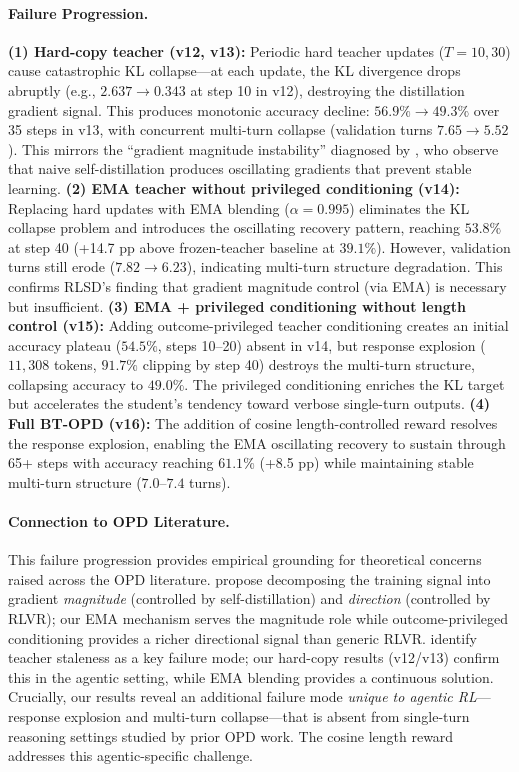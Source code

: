 \documentclass{article}
\begin{document}
\paragraph{Failure Progression.}
\textbf{(1) Hard-copy teacher (v12, v13):} Periodic hard teacher updates ($T{=}10, 30$) cause catastrophic KL collapse---at each update, the KL divergence drops abruptly (e.g., $2.637 \to 0.343$ at step 10 in v12), destroying the distillation gradient signal. This produces monotonic accuracy decline: $56.9\% \to 49.3\%$ over 35 steps in v13, with concurrent multi-turn collapse (validation turns $7.65 \to 5.52$). This mirrors the ``gradient magnitude instability'' diagnosed by \citet{yang26rlsd}, who observe that naive self-distillation produces oscillating gradients that prevent stable learning.
%
\textbf{(2) EMA teacher without privileged conditioning (v14):} Replacing hard updates with EMA blending ($\alpha{=}0.995$) eliminates the KL collapse problem and introduces the oscillating recovery pattern, reaching $53.8\%$ at step 40 (+14.7 pp above frozen-teacher baseline at $39.1\%$). However, validation turns still erode ($7.82 \to 6.23$), indicating multi-turn structure degradation. This confirms RLSD's finding that gradient magnitude control (via EMA) is necessary but insufficient.
%
\textbf{(3) EMA + privileged conditioning without length control (v15):} Adding outcome-privileged teacher conditioning creates an initial accuracy plateau ($54.5\%$, steps 10--20) absent in v14, but response explosion ($11{,}308$ tokens, $91.7\%$ clipping by step 40) destroys the multi-turn structure, collapsing accuracy to $49.0\%$. The privileged conditioning enriches the KL target but accelerates the student's tendency toward verbose single-turn outputs.
%
\textbf{(4) Full BT-OPD (v16):} The addition of cosine length-controlled reward resolves the response explosion, enabling the EMA oscillating recovery to sustain through 65+ steps with accuracy reaching $61.1\%$ (+8.5 pp) while maintaining stable multi-turn structure ($7.0$--$7.4$ turns).

\paragraph{Connection to OPD Literature.}
This failure progression provides empirical grounding for theoretical concerns raised across the OPD literature. \citet{yang26rlsd} propose decomposing the training signal into gradient \emph{magnitude} (controlled by self-distillation) and \emph{direction} (controlled by RLVR); our EMA mechanism serves the magnitude role while outcome-privileged conditioning provides a richer directional signal than generic RLVR. \citet{zhao26opsd} identify teacher staleness as a key failure mode; our hard-copy results (v12/v13) confirm this in the agentic setting, while EMA blending provides a continuous solution. Crucially, our results reveal an additional failure mode \emph{unique to agentic RL}---response explosion and multi-turn collapse---that is absent from single-turn reasoning settings studied by prior OPD work. The cosine length reward addresses this agentic-specific challenge.
\end{document}
